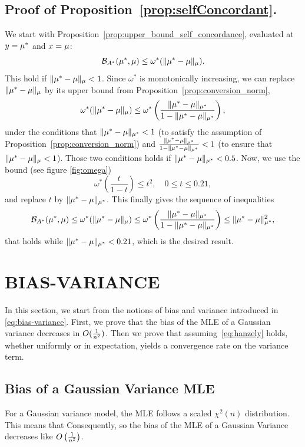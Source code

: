 \subsection{Proof of Proposition~\ref{prop:selfConcordant}.}

We start with Proposition~\ref{prop:upper_bound_self_concordance}, evaluated at $y=\mu^*$ and $x=\mu$:
\[
	{\mathcal B}_{A^*}(\mu^*,\mu) \leq \omega^*(\|\mu^*-\mu\|_{\mu}).
\]
This hold if $\|\mu^*-\mu\|_{\mu}<1$. Since $\omega^*$ is monotonically increasing, we can replace $\|\mu^*-\mu\|_{\mu}$ by its upper bound from Proposition~\ref{prop:conversion_norm},
\[
	\omega^*(\|\mu^*-\mu\|_{\mu}) \leq \omega^*\left(\frac{\|\mu^*-\mu\|_{\mu^*}}{1-\|\mu^*-\mu\|_{\mu^*}}\right),
\]
under the conditions that $\|\mu^*-\mu\|_{\mu^*}<1$ (to satisfy the assumption of Proposition~\ref{prop:conversion_norm}) and $\frac{\|\mu^*-\mu\|_{\mu^*}}{1-\|\mu^*-\mu\|_{\mu^*}} <1$ (to ensure that $\|\mu^*-\mu\|_{\mu} <1$). Those two conditions holds if $\|\mu^*-\mu\|_{\mu^*} <0.5$. Now, we use the bound (see figure \ref{fig:omega})
\[
	\omega^*\left(\frac{t}{1-t}\right) \leq t^2, \quad 0\leq t \leq 0.21,
\]
and replace $t$ by $\|\mu^*-\mu\|_{\mu^*}$. This finally gives the sequence of inequalities
\[
	{\mathcal B}_{A^*}(\mu^*,\mu) \leq \omega^*(\|\mu^*-\mu\|_{\mu}) \leq \omega^*\left(\frac{\|\mu^*-\mu\|_{\mu^*}}{1-\|\mu^*-\mu\|_{\mu^*}}\right) \leq \|\mu^*-\mu\|_{\mu^*}^2,
\]
that holds while $ \|\mu^*-\mu\|_{\mu^*}<0.21$, which is the desired result.



\section{BIAS-VARIANCE}
\label{app:bias-variance}
In this section, we start from the notions of bias and variance introduced in \cref{eq:bias-variance}.
First, we prove that the bias of the MLE of a Gaussian variance decreases in $O(\frac{1}{n^2})$. 
Then we prove that assuming~\eqref{eq:hanzely} holds, whether uniformly or in expectation, yields a convergence rate on the variance term.

\subsection{Bias of a Gaussian Variance MLE}
For a Gaussian variance model, the MLE follows a scaled $\chi^2(n)$ distribution. 
This means that
Consequently,
so the bias of the MLE of a Gaussian Variance decreases like $O\left(\frac{1}{n^2}\right)$.

